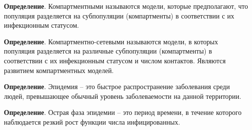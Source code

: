 \documentclass[10pt, unicode, xcolor={svgnames, table, hyperref}]{beamer}
\begin{document}
\begin{frame}[fragile,t]{}

	\begin{defin}
		\small
		\textbf{Определение}.
		Компартментными называются модели, которые предполагают, что популяция разделяется на субпопуляции (компартменты) в соответствии с их инфекционным статусом.
		
	\end{defin}	

	\begin{defin}
		\small
		\textbf{Определение}.
		Компартментно-сетевыми называются модели, в которых популяция разделяется на различные субпопуляции (компартменты) в соответствии с их инфекционным статусом и числом контактов. Являются развитием компартментных моделей.
	\end{defin}	

	\begin{defin}
		\small
		\textbf{Определение}.
		Эпидемия -- это быстрое распространение
		заболевания среди людей, превышающее обычный уровень заболеваемости на данной территории.
	\end{defin}	
		
	\begin{defin}
		\small
		\textbf{Определение}.
		Острая фаза эпидемии -- это период времени, в течение которого наблюдается резкий рост функции числа инфицированных.
	\end{defin}		
		
	
\end{frame}
	
\end{document}
